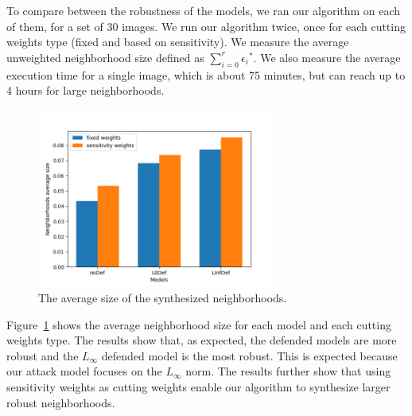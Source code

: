 To compare between the robustness of the models, we ran our algorithm on each of them, for a set of 30 images.
We run our algorithm twice, once for each cutting weights type (fixed and based on sensitivity).
We measure the average unweighted neighborhood size defined as $\sum_{i=0}^{r}{{\epsilon_i}^*}$.
We also measure the average execution time for a single image, which is about 75 minutes, but can reach up to 4 hours for large neighborhoods.
\begin{figure}
    \centering
    \includegraphics[width=0.7\textwidth]{neighborhoods_average_size.png}
    \caption{The average size of the synthesized neighborhoods.}
    \label{fig:neighborhoods_average_size}
\end{figure}
Figure~\ref{fig:neighborhoods_average_size} shows the average neighborhood size for each model and each cutting weights type.
The results show that, as expected, the defended models are more robust and the $L_{\infty}$ defended model is the most robust.
This is expected because our attack model focuses on the $L_{\infty}$ norm.
 The results further show that using sensitivity weights as cutting weights enable our algorithm to synthesize larger robust neighborhoods.
%


